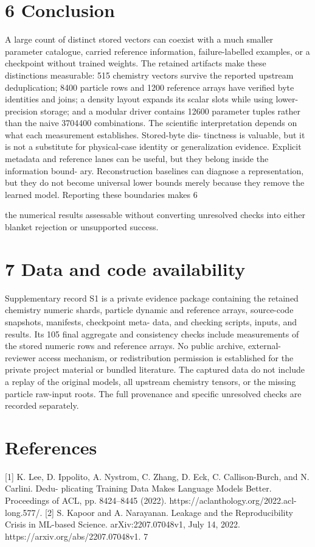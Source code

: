 \documentclass[11pt]{article}
\begin{document}
\section*{6 Conclusion}

A large count of distinct stored vectors can coexist with a much smaller parameter catalogue, carried
reference information, failure-labelled examples, or a checkpoint without trained weights. The
retained artifacts make these distinctions measurable: 515 chemistry vectors survive the reported
upstream deduplication; 8400 particle rows and 1200 reference arrays have verified byte identities
and joins; a density layout expands its scalar slots while using lower-precision storage; and a
modular driver contains 12600 parameter tuples rather than the naive 3704400 combinations.
The scientific interpretation depends on what each measurement establishes. Stored-byte dis-
tinctness is valuable, but it is not a substitute for physical-case identity or generalization evidence.
Explicit metadata and reference lanes can be useful, but they belong inside the information bound-
ary. Reconstruction baselines can diagnose a representation, but they do not become universal
lower bounds merely because they remove the learned model. Reporting these boundaries makes
6

the numerical results assessable without converting unresolved checks into either blanket rejection
or unsupported success.

\section*{7 Data and code availability}

Supplementary record S1 is a private evidence package containing the retained chemistry numeric
shards, particle dynamic and reference arrays, source-code snapshots, manifests, checkpoint meta-
data, and checking scripts, inputs, and results. Its 105 final aggregate and consistency checks
include measurements of the stored numeric rows and reference arrays.
No public archive, external-reviewer access mechanism, or redistribution permission is established
for the private project material or bundled literature. The captured data do not include a replay of
the original models, all upstream chemistry tensors, or the missing particle raw-input roots. The
full provenance and specific unresolved checks are recorded separately.

\section*{References}

[1] K. Lee, D. Ippolito, A. Nystrom, C. Zhang, D. Eck, C. Callison-Burch, and N. Carlini. Dedu-
plicating Training Data Makes Language Models Better. Proceedings of ACL, pp. 8424–8445
(2022). https://aclanthology.org/2022.acl-long.577/.
[2] S. Kapoor and A. Narayanan. Leakage and the Reproducibility Crisis in ML-based Science.
arXiv:2207.07048v1, July 14, 2022. https://arxiv.org/abs/2207.07048v1.
7
\end{document}
